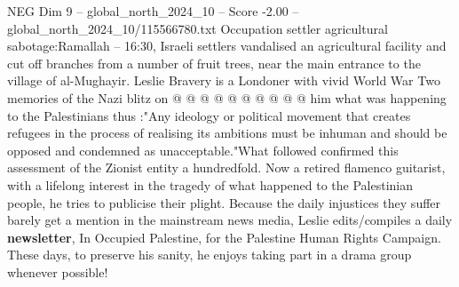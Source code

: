 \begin{textsample}{NEG Dim 9 – global\_north\_2024\_10 – Score -2.00 – global\_north\_2024\_10/115566780.txt}
Occupation settler agricultural sabotage:Ramallah -- 16:30, Israeli settlers vandalised an agricultural facility and cut off branches from a number of fruit trees, near the main entrance to the village of al-Mughayir.
Leslie Bravery is a Londoner with vivid World War Two memories of the Nazi blitz on @ @ @ @ @ @ @ @ @ @ him what was happening to the Palestinians thus :"Any ideology or political movement that creates refugees in the process of realising its ambitions must be inhuman and should be opposed and condemned as unacceptable."What followed confirmed this assessment of the Zionist entity a hundredfold.
Now a retired flamenco guitarist, with a lifelong interest in the tragedy of what happened to the Palestinian people, he tries to publicise their plight.
Because the daily injustices they suffer barely get a mention in the mainstream news media, Leslie edits/compiles a daily \textbf{newsletter}, In Occupied Palestine, for the Palestine Human Rights Campaign.
These days, to preserve his sanity, he enjoys taking part in a drama group whenever possible!

\end{textsample}
